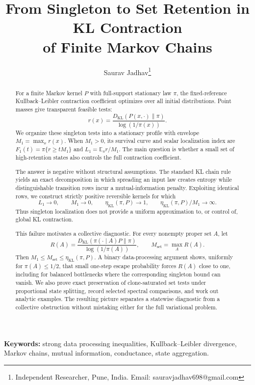 \documentclass[11pt]{article}
\title{From Singleton to Set Retention in KL Contraction\\
of Finite Markov Chains}
\author{
  Saurav Jadhav\thanks{Independent Researcher, Pune, India.
    Email: sauravjadhav698@gmail.com}
}
\date{}
\newcommand{\KL}{D_{\mathrm{KL}}}
\newcommand{\etaKL}{\eta_{\mathrm{KL}}}
\newcommand{\Mone}{M_1}
\newcommand{\Lone}{L_1}
\newcommand{\Mset}{M_{\mathrm{set}}}
\newcommand{\E}{\mathbb{E}}
\begin{document}
\maketitle

\begin{abstract}
For a finite Markov kernel \(P\) with full-support stationary law \(\pi\),
the fixed-reference Kullback--Leibler contraction coefficient optimizes over
all initial distributions.  Point masses give transparent feasible tests:
\[
  r(x)=\frac{\KL(P(x,\cdot)\|\pi)}{\log(1/\pi(x))}.
\]
We organize these singleton tests into a stationary profile with envelope
\(\Mone=\max_x r(x)\).  When \(\Mone>0\), its survival curve and scalar
localization index are
\(F_1(t)=\pi\{r\ge t\Mone\}\) and
\(\Lone=\E_\pi r/\Mone\).  The main question is whether a small set of
high-retention states also controls the full contraction coefficient.

The answer is negative without structural assumptions.  The standard
KL chain rule yields an exact decomposition in which spreading an input law
creates entropy while distinguishable transition rows incur a
mutual-information penalty.  Exploiting identical rows, we construct
strictly positive reversible kernels for which
\[
  \Lone\longrightarrow0,\qquad
  \Mone\longrightarrow0,\qquad
  \etaKL(\pi,P)\longrightarrow1,
  \qquad
  \etaKL(\pi,P)/\Mone\longrightarrow\infty .
\]
Thus singleton localization does not provide a uniform approximation to,
or control of, global KL contraction.

This failure motivates a collective diagnostic.  For every nonempty proper
set \(A\), let
\[
  R(A)=
  \frac{\KL(\pi(\cdot\mid A)P\|\pi)}{\log(1/\pi(A))},
  \qquad
  \Mset=\max_A R(A).
\]
Then \(\Mone\le\Mset\le\etaKL(\pi,P)\).  A binary data-processing argument
shows, uniformly for \(\pi(A)\le1/2\), that small one-step escape probability
forces \(R(A)\) close to one, including for balanced bottlenecks where the corresponding
singleton bound can vanish.  We also prove exact preservation of
clone-saturated set tests under proportional state splitting, record selected spectral comparisons, and
work out analytic examples.  The resulting picture separates a
statewise diagnostic from a collective obstruction without mistaking
either for the full variational problem.
\end{abstract}

\noindent\textbf{Keywords:}
strong data processing inequalities, Kullback--Leibler divergence,
Markov chains, mutual information, conductance, state aggregation.
\end{document}

